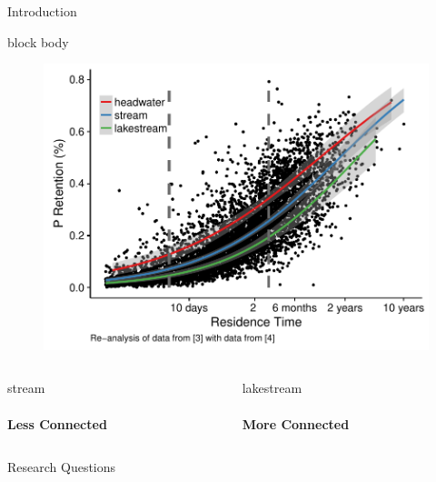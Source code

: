 \documentclass[final,hyperref={pdfpagelabels=false}]{beamer}
\begin{document}
\begin{frame}[t]
\begin{columns}[t]
\begin{column}{.465\textwidth}
\begin{block}{Introduction}
\vspace{0.5em}
{
\begin{beamercolorbox}[wd=\textwidth,rounded=true]{block body}
   \begin{figure}
      \includegraphics[width=\linewidth]{milstead_multi.pdf}
   \end{figure}
\end{beamercolorbox}
}

\vspace{1.4em}

\begin{columns}

\begin{column}{0.5\textwidth}
\centering
\large stream \\
\vspace{0.5em}
 \\
\textbf{Less Connected}
\end{column}

\begin{column}{0.5\textwidth}
\centering
\large lakestream \\
\vspace{0.5em}
 \\
\textbf{More Connected}
\end{column}
\end{columns}
\vspace{0.3em}

\vspace{0.5em}
\end{block}
\vspace{1em}
\begin{block}{Research Questions}


\end{block}
\end{column}
\end{columns}
\end{frame}
\end{document}
